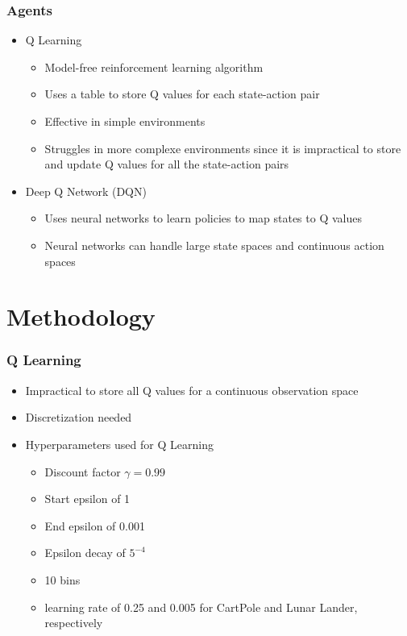 \documentclass{beamer}
\begin{document}
\begin{frame}
    \frametitle{Agents}
    \begin{itemize}
        \item Q Learning \pause
              \begin{itemize}
                  \item Model-free reinforcement learning algorithm \pause
                  \item Uses a table to store Q values for each state-action pair \pause
                  \item Effective in simple environments\pause
                  \item Struggles in more complexe environments since it is impractical to store and
                        update Q values for all the state-action pairs\pause
              \end{itemize}
        \item Deep Q Network (DQN) \pause
              \begin{itemize}
                  \item Uses neural networks to learn policies to map states to Q values\pause
                  \item Neural networks can handle large state spaces and continuous action spaces
              \end{itemize}
    \end{itemize}
\end{frame}

\section{Methodology}

\begin{frame}
    \frametitle{Q Learning}

    \begin{itemize}
        \item Impractical to store all Q values for a continuous observation space \pause
        \item Discretization needed \pause
        \item Hyperparameters used for Q Learning\pause
              \begin{itemize}
                  \item Discount factor \(\gamma = 0.99\)
                  \item Start epsilon of 1
                  \item End epsilon of 0.001
                  \item Epsilon decay of \(5^{-4}\)
                  \item 10 bins
                  \item learning rate of 0.25 and 0.005 for CartPole and Lunar Lander, respectively
              \end{itemize}
    \end{itemize}

\end{frame}
\end{document}
